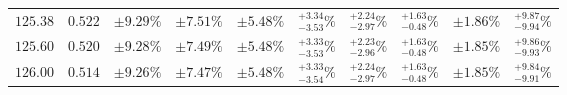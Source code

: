 \begin{table}[ht!]
{{\begin{tabular}{| cc | ccc | cccc | c |}
$125.38$ & $0.522$ & $\pm9.29\%$ & {\color{black!55}$\pm 7.51\%$} & {\color{black!55}$\pm 5.48\%$} & $^{+3.34}_{-3.53}\%$ & {\color{black!55}$^{+2.24}_{-2.97}\%$} & {\color{black!55}$^{+1.63}_{-0.48}\%$} & {\color{black!55}$\pm 1.86\%$} & $^{+9.87}_{-9.94}\%$  \\
$125.60$ & $0.520$ & $\pm9.28\%$ & {\color{black!55}$\pm 7.49\%$} & {\color{black!55}$\pm 5.48\%$} & $^{+3.33}_{-3.53}\%$ & {\color{black!55}$^{+2.23}_{-2.96}\%$} & {\color{black!55}$^{+1.63}_{-0.48}\%$} & {\color{black!55}$\pm 1.85\%$} & $^{+9.86}_{-9.93}\%$  \\
$126.00$ & $0.514$ & $\pm9.26\%$ & {\color{black!55}$\pm 7.47\%$} & {\color{black!55}$\pm 5.48\%$} & $^{+3.33}_{-3.54}\%$ & {\color{black!55}$^{+2.24}_{-2.97}\%$} & {\color{black!55}$^{+1.63}_{-0.48}\%$} & {\color{black!55}$\pm 1.85\%$} & $^{+9.84}_{-9.91}\%$  \\

\end{tabular}}}
\end{table}
